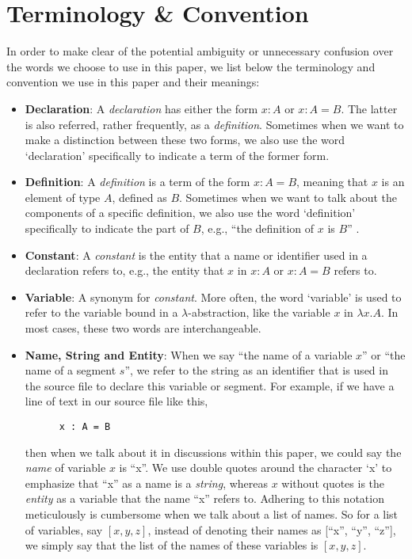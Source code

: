 \chapter{Terminology \& Convention}\label{chapter:term}
In order to make clear of the potential ambiguity or unnecessary confusion over the words we choose to use in this paper, we list below the terminology and convention we use in this paper and their meanings:
\begin{itemize}
  \item \textbf{Declaration}: A \emph{declaration} has either the form $x : A$ or $x : A = B$. The latter is also referred, rather frequently, as a \emph{definition}. Sometimes when we want to make a distinction between these two forms, we also use the word `declaration' specifically to indicate a term of the former form. 
  \item \textbf{Definition}: A \emph{definition} is a term of the form $x : A = B$, meaning that $x$ is an element of type $A$, defined as $B$. Sometimes when we want to talk about the components of a specific definition, we also use the word `definition' specifically to indicate the part of $B$, e.g., ``the definition of $x$ is $B$'' .  
  \item \textbf{Constant}: A \emph{constant} is the entity that a name or identifier used in a declaration refers to, e.g., the entity that $x$ in $x : A$ or $x : A = B$ refers to.
  \item \textbf{Variable}: A synonym for \emph{constant}. More often, the word `variable' is used to refer to the variable bound in a $\lambda$-abstraction, like the variable $x$ in $\lambda x . A$. In most cases, these two words are interchangeable. 
  \item \textbf{Name, String and Entity}: When we say ``the name of a variable $x$'' or ``the name of a segment $s$'', we refer to the string as an identifier that is used in the source file to declare this variable or segment. For example, if we have a line of text in our source file like this,
    \begin{lstlisting}
      x : A = B
    \end{lstlisting}
    then when we talk about it in discussions within this paper, we could say the \emph{name} of variable $x$ is ``x''. We use double quotes around the character `x' to emphasize that ``x'' as a name is a \emph{string}, whereas $x$ without quotes is the \emph{entity} as a variable that the name ``x'' refers to. Adhering to this notation meticulously is cumbersome when we talk about a list of names. So for a list of variables, say $[x,y,z]$, instead of denoting their names as [``x'', ``y'', ``z''], we simply say that the list of the names of these variables is $[x,y,z]$.
\end{itemize}
